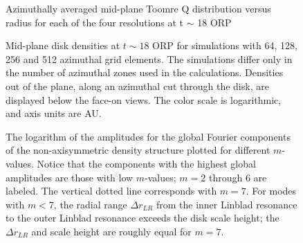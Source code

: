 \documentclass[manuscript]{aastex}
\begin{document}



\newpage

\begin{figure}
\caption{Azimuthally averaged mid-plane Toomre Q distribution versus radius for each of the four resolutions at t $\sim$ 18 ORP}
\label{fig:Final_Q}
\end{figure}

\begin{figure}
\caption
{
Mid-plane disk densities at $t \sim 18$ ORP for simulations with 64, 128, 256 and 512 azimuthal grid elements.
The simulations differ only in the number of  azimuthal zones used in the calculations.  Densities out of the plane, along an azimuthal cut through the disk, are displayed below the face-on views.  The color scale is logarithmic, and axis units are AU. 
}
\label{fig:DensityPlots}
\end{figure}
\newpage

\begin{figure}
\caption
{
The logarithm of the amplitudes for the global Fourier components of the non-axisymmetric density structure plotted for
different $m$-values. Notice that the components with the highest global amplitudes are those with low $m$-values; $m=2$
through 6 are labeled.  The vertical dotted line corresponds with $m=7$.  For modes with $m < 7$,  the radial range
$\Delta r_{LR}$ from  the inner Linblad resonance to the outer Linblad resonance exceeds the disk scale height; the
$\Delta r_{LR}$ and scale height are roughly equal for $m = 7$.
}
\label{fig:Am_vs_log_m}
\end{figure}
\end{document}
